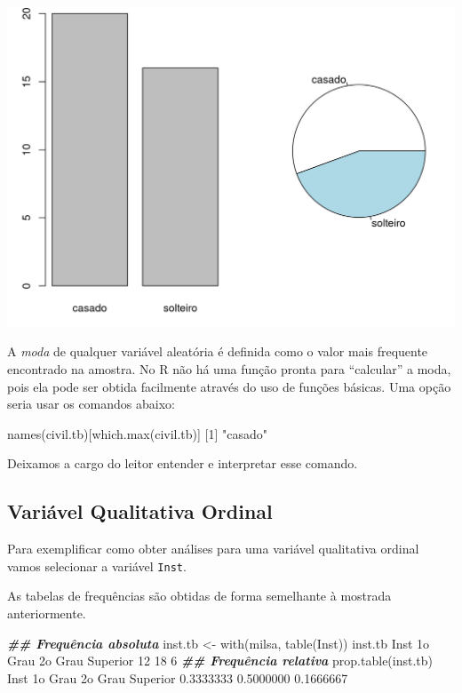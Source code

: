 \documentclass[
  10pt,
  a4paper]{book}
\newenvironment{Shaded}{\begin{snugshade}}{\end{snugshade}}
\newcommand{\DecValTok}[1]{\textcolor[rgb]{0.00,0.00,0.81}{#1}}
\newcommand{\DocumentationTok}[1]{\textcolor[rgb]{0.56,0.35,0.01}{\textbf{\textit{#1}}}}
\newcommand{\FloatTok}[1]{\textcolor[rgb]{0.00,0.00,0.81}{#1}}
\newcommand{\FunctionTok}[1]{\textcolor[rgb]{0.00,0.00,0.00}{#1}}
\newcommand{\NormalTok}[1]{#1}
\newcommand{\OtherTok}[1]{\textcolor[rgb]{0.56,0.35,0.01}{#1}}
\newcommand{\StringTok}[1]{\textcolor[rgb]{0.31,0.60,0.02}{#1}}
\begin{document}
\begin{center}\includegraphics{figures/unnamed-chunk-295-1} \end{center}

A \emph{moda} de qualquer variável aleatória é definida como o valor mais
frequente encontrado na amostra. No R não há uma função pronta para
``calcular'' a moda, pois ela pode ser obtida facilmente através do uso de
funções básicas. Uma opção seria usar os comandos abaixo:

\begin{Shaded}
\begin{Highlighting}[]
\FunctionTok{names}\NormalTok{(civil.tb)[}\FunctionTok{which.max}\NormalTok{(civil.tb)]}
\NormalTok{[}\DecValTok{1}\NormalTok{] }\StringTok{"casado"}
\end{Highlighting}
\end{Shaded}

Deixamos a cargo do leitor entender e interpretar esse comando.

\hypertarget{variuxe1vel-qualitativa-ordinal}{%
\subsection{Variável Qualitativa Ordinal}\label{variuxe1vel-qualitativa-ordinal}}

Para exemplificar como obter análises para uma variável qualitativa
ordinal vamos selecionar a variável \texttt{Inst}.

As tabelas de frequências são obtidas de forma semelhante à mostrada
anteriormente.

\begin{Shaded}
\begin{Highlighting}[]
\DocumentationTok{\#\# Frequência absoluta}
\NormalTok{inst.tb }\OtherTok{\textless{}{-}} \FunctionTok{with}\NormalTok{(milsa, }\FunctionTok{table}\NormalTok{(Inst))}
\NormalTok{inst.tb}
\NormalTok{Inst}
\NormalTok{ 1o Grau  2o Grau Superior }
      \DecValTok{12}       \DecValTok{18}        \DecValTok{6} 
\DocumentationTok{\#\# Frequência relativa}
\FunctionTok{prop.table}\NormalTok{(inst.tb)}
\NormalTok{Inst}
\NormalTok{  1o Grau   2o Grau  Superior }
\FloatTok{0.3333333} \FloatTok{0.5000000} \FloatTok{0.1666667} 
\end{Highlighting}
\end{Shaded}
\end{document}
